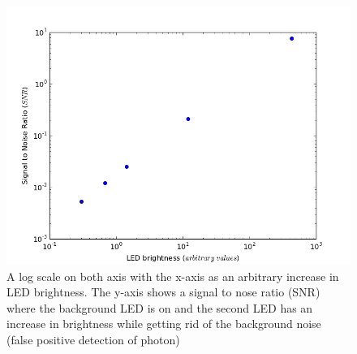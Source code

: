 \documentclass[12 pt,twoside]{article}
\begin{document}
\begin{center}
\begin{figure}[!hb]
\includegraphics[scale=0.7]{figure_10}
\caption{\small A log scale on both axis with the x-axis as an arbitrary increase in LED brightness. The y-axis shows a signal to nose ratio (SNR) where the background LED is on and the second LED has an increase in brightness while getting rid of the background noise (false positive detection of photon)}
\end{figure}
\end{center}
\end{document}

